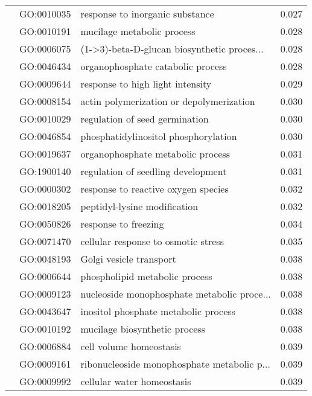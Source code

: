 \begin{longtable}{lllr}
   & GO:0010035 &              response to inorganic substance &         0.027 \\
   & GO:0010191 &                   mucilage metabolic process &         0.028 \\
   & GO:0006075 &  (1->3)-beta-D-glucan biosynthetic proces... &         0.028 \\
   & GO:0046434 &            organophosphate catabolic process &         0.028 \\
   & GO:0009644 &             response to high light intensity &         0.029 \\
   & GO:0008154 &     actin polymerization or depolymerization &         0.030 \\
   & GO:0010029 &               regulation of seed germination &         0.030 \\
   & GO:0046854 &         phosphatidylinositol phosphorylation &         0.030 \\
   & GO:0019637 &            organophosphate metabolic process &         0.031 \\
   & GO:1900140 &           regulation of seedling development &         0.031 \\
   & GO:0000302 &          response to reactive oxygen species &         0.032 \\
   & GO:0018205 &                 peptidyl-lysine modification &         0.032 \\
   & GO:0050826 &                         response to freezing &         0.034 \\
   & GO:0071470 &          cellular response to osmotic stress &         0.035 \\
   & GO:0048193 &                      Golgi vesicle transport &         0.038 \\
   & GO:0006644 &               phospholipid metabolic process &         0.038 \\
   & GO:0009123 &  nucleoside monophosphate metabolic proce... &         0.038 \\
   & GO:0043647 &         inositol phosphate metabolic process &         0.038 \\
   & GO:0010192 &                mucilage biosynthetic process &         0.038 \\
   & GO:0006884 &                      cell volume homeostasis &         0.039 \\
   & GO:0009161 &  ribonucleoside monophosphate metabolic p... &         0.039 \\
   & GO:0009992 &                   cellular water homeostasis &         0.039 \\

\end{longtable}
